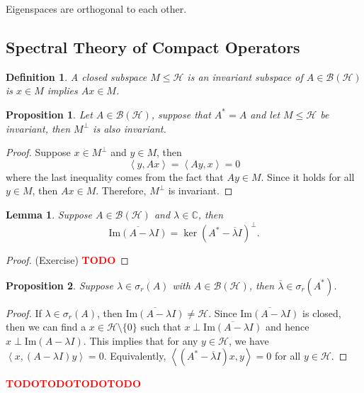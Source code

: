 \documentclass{article}
\newtheorem*{proposition}{Proposition}
\newtheorem*{lemma}{Lemma}
\newtheorem*{definition}{Definition}
\newcommand{\C}{\mathbb{C}}
\newcommand{\B}{\mathcal{B}}
\renewcommand{\H}{\mathcal{H}}
\newcommand{\inner}[2]{\left\langle#1 , #2 \right\rangle}
\renewcommand{\Im}{\text{Im}}
\newcommand{\td}{\textcolor{red}{\textbf{TODO}}}
\begin{document}
Eigenspaces are orthogonal to each other.

\subsection{Spectral Theory of Compact Operators}

\begin{definition}
    A closed subspace $M \leq \H$ is an invariant subspace of $A \in \B(\H)$ is $x \in M$ implies $Ax \in M$.
\end{definition}

\begin{proposition}
    Let $A \in \B(\H)$, suppose that $A^* = A$ and let $M \leq \H$ be invariant, then $M^{\perp}$ is also invariant.
\end{proposition}

\begin{proof}
    Suppose $x \in M^{\perp}$ and $y \in M$, then
    $$\inner{y}{Ax} = \inner{Ay}{x} = 0$$
    where the last inequality comes from the fact that $Ay \in M$. Since it holds for all $y \in M$, then $Ax \in M$. Therefore, $M^{\perp}$ is invariant.
\end{proof}

\begin{lemma}
    Suppose $A \in \B(\H)$ and $\lambda \in \C$, then 
    $$\overline{\Im(A - \lambda I)} = \ker(A^* - \overline{\lambda} I)^{\perp}.$$
\end{lemma}

\begin{proof}
    (Exercise) \td
\end{proof}

\begin{proposition}
    Suppose $\lambda \in \sigma_r(A)$ with $A \in \B(\H)$, then $\overline{\lambda} \in \sigma_r(A^*)$.
\end{proposition}

\begin{proof}
    If $\lambda \in \sigma_r(A)$, then $\overline{\Im(A - \lambda I)} \neq \H$. Since $\overline{\Im(A - \lambda I)}$ is closed, then we can find a $x \in \H \setminus \{0\}$ such that $x \perp \overline{\Im(A - \lambda I)}$ and hence $x \perp \Im(A - \lambda I)$. This implies that for any $y \in \H$, we have $\inner{x}{(A - \lambda I)y} = 0$. Equivalently, $\inner{(A^* - \overline{\lambda} I)x}{y} = 0$ for all $y \in \H$.
\end{proof}

\td \td \td \td
\end{document}
